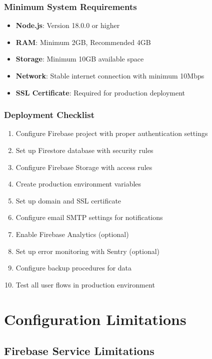 \documentclass[12pt,a4paper]{article}
\begin{document}
\subsubsection{Minimum System Requirements}

\begin{itemize}[leftmargin=*]
    \item \textbf{Node.js}: Version 18.0.0 or higher
    \item \textbf{RAM}: Minimum 2GB, Recommended 4GB
    \item \textbf{Storage}: Minimum 10GB available space
    \item \textbf{Network}: Stable internet connection with minimum 10Mbps
    \item \textbf{SSL Certificate}: Required for production deployment
\end{itemize}

\subsubsection{Deployment Checklist}

\begin{enumerate}[leftmargin=*]
    \item Configure Firebase project with proper authentication settings
    \item Set up Firestore database with security rules
    \item Configure Firebase Storage with access rules
    \item Create production environment variables
    \item Set up domain and SSL certificate
    \item Configure email SMTP settings for notifications
    \item Enable Firebase Analytics (optional)
    \item Set up error monitoring with Sentry (optional)
    \item Configure backup procedures for data
    \item Test all user flows in production environment
\end{enumerate}

\section{Configuration Limitations}

\subsection{Firebase Service Limitations}
\end{document}
